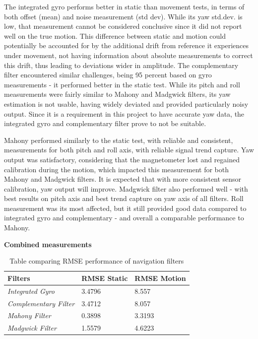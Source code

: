 The integrated gyro performs better in static than movement tests, in terms of both offset (mean) and noise measurement (std dev). While its yaw std.dev. is low, that measurement cannot be considered conclusive since it did not report well on the true motion. This difference between static and motion could potentially be accounted for by the additional drift from reference it experiences under movement, not having information about absolute measurements to correct this drift, thus leading to deviations wider in amplitude. The complementary filter encountered similar challenges, being 95 percent based on gyro measurements - it performed better in the static test. While its pitch and roll measurements were  fairly similar to Mahony and Madgwick filters, its yaw estimation is not usable, having widely deviated and provided particularly noisy output. Since it is a requirement in this project to have accurate yaw data, the integrated gyro and complementary filter prove to not be suitable. 

Mahony performed similarly to the static test, with reliable and consistent, measurements for both pitch and roll axis, with reliable signal trend capture. Yaw output was satisfactory, considering that the magnetometer lost and regained calibration during the motion, which impacted this measurement for both Mahony and Madgwick filters. It is expected that with more consistent sensor calibration, yaw output will improve. Madgwick filter also performed well - with best results on pitch axis  and best trend capture on yaw axis of all filters. Roll measurement was its most affected, but it still provided good data compared to integrated gyro and complementary - and overall a comparable performance to Mahony. 


\textbf{Combined measurements}

\begin{table}[h!]
\centering
\begin{tabular}{ | m{7em} | m{1.5cm}|m{1.75cm}| } 
\hline
\textbf{Filters} & \textbf{RMSE Static} & \textbf{RMSE Motion} \\
\hline
\textit{Integrated Gyro} & 3.4796 & 8.557   \\
\hline
\textit{Complementary Filter}&3.4712 & 8.057  \\ 
\hline
\textit{Mahony Filter} &0.3898& 3.3193  \\ 
\hline
\textit{Madgwick Filter}& 1.5579& 4.6223  \\
\hline
\end{tabular}
\caption{Table comparing RMSE performance of navigation filters}
\label{table:3}
\end{table}


